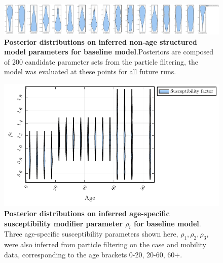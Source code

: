 \label{a1}

\begin{figure}[H]
\centering
\includegraphics[width = 18 cm]{appendices/FigureS1.pdf}
\caption[Posterior distributions on inferred non-age structured model parameters for baseline model.]{\textbf{Posterior distributions on inferred non-age structured model parameters for baseline model}.Posteriors are composed of 200 candidate parameter sets from the particle filtering, the model was evaluated at these points for all future runs.}
\label{s1}
\end{figure}

\begin{figure}[H]
    \centering
    \includegraphics[width = 12 cm]{appendices/FigureS2.pdf}
    \caption{\textbf{Posterior distributions on inferred age-specific susceptibility modifier parameter $\rho_i$ for baseline model}. Three age-specific susceptibility parameters shown here, $\rho_1,\rho_2,\rho_3$, were also inferred from particle filtering on the case and mobility data, corresponding to the age brackets 0-20, 20-60, 60+.}
    \label{s2}
    \end{figure}
    
    \clearpage 
    
